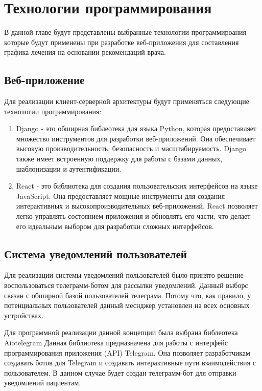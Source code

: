\documentclass[14pt]{extreport}
\begin{document}
\chapter{Технологии программирования}
    В данной главе будут представлены выбранные технологии программироания %
    которые будут применены при разработке веб-приложения для составления %
    графика лечения на основании рекомендаций врача.

    \section{Веб-приложение}
        Для реализации клиент-серверной архитектуры будут применяться %
        следующие технологии программирования:
        \begin{enumerate}
            \item Django \cite{django} - это обширная библеотека для %
            языка Python, которая предоставляет множество инструментов для %
            разработки веб-приложений. Она обеспечивает высокую производительность, %
            безопасность и масштабируемость. Django также имеет встроенную поддержку %
            для работы с базами данных, шаблонизации и аутентификации.
            \item React \cite{react} - это библиотека для создания пользовательских %
            интерфейсов на языке JavaScript. Она предоставляет мощные инструменты %
            для создания интерактивных и высокопроизводительных веб-приложений. %
            React позволяет легко управлять состоянием приложения и обновлять %
            его части, что делает его идеальным выбором для разработки %
            сложных интерфейсов.
        \end{enumerate}
    
    \section{Система уведомлений пользователей}
        Для реализации системы уведомлений пользователей было принято решение %
        воспользоваться телеграмм-ботом для рассылки уведомлений. Данный выборс связан %
        с обширной базой пользователей телеграма\cite{telegram}. Потому что, как правило, %
        у потенциальных пользователей данный меснджер установлен на всех основных устройствах.

        Для программной реализации данной концепции была выбрана библеотека Aiotelegram \cite{aiotelegram} %
        Данная библиотека предназначена для работы с интерфейс программирования приложения (API) Telegram. Она позволяет %
        разработчикам создавать ботов для Telegram и создавать интерактивные пути взаимодействия с пользователем. В данном %
        случае будет создан телеграмм-бот для отправки уведомлений пациентам.
    
\end{document}
